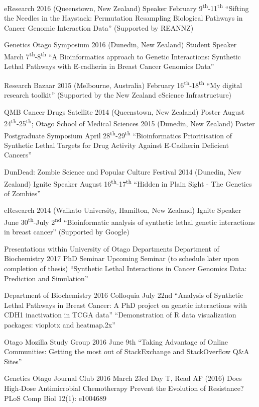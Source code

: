 eResearch 2016 (Queenstown, New Zealand) Speaker February 9\textsuperscript{th}-11\textsuperscript{th}
``Sifting the Needles in the Haystack: Permutation Resampling Biological Pathways in Cancer Genomic Interaction Data'' (Supported by REANNZ)

Genetics Otago Symposium 2016 (Dunedin, New Zealand) Student Speaker March 7\textsuperscript{th}-8\textsuperscript{th} 
``A Bioinformatics approach to Genetic Interactions: Synthetic Lethal Pathways with E-cadherin in Breast Cancer Genomics Data''

Research Bazaar 2015 (Melbourne, Australia) February 16\textsuperscript{th}-18\textsuperscript{th}
``My digital research toolkit'' (Supported by the New Zealand eScience Infrastructure)


QMB Cancer Drugs Satellite 2014 (Queenstown, New Zealand) Poster August 24\textsuperscript{th}-25\textsuperscript{th};
Otago School of Medical Sciences 2015 (Dunedin, New Zealand) Poster Postgraduate Symposium April 28\textsuperscript{th}-29\textsuperscript{th}
“Bioinformatics Prioritisation of Synthetic Lethal Targets for Drug Activity Against E-Cadherin Deficient Cancers”

DunDead: Zombie Science and Popular Culture Festival 2014 (Dunedin, New Zealand) Ignite Speaker August 16\textsuperscript{th}-17\textsuperscript{th}
``Hidden in Plain Sight - The Genetics of Zombies''


eResearch 2014 (Waikato University, Hamilton, New Zealand) Ignite Speaker June 30\textsuperscript{th}-July 2\textsuperscript{nd}
``Bioinformatic analysis of synthetic lethal genetic interactions in breast cancer'' (Supported by Google)


\iffalse
Presentations within University of Otago Departments
Department of Biochemistry 2017 PhD Seminar
Upcoming Seminar (to schedule later upon completion of thesis)
``Synthetic Lethal Interactions in Cancer Genomics Data: Prediction and Simulation''

Department of Biochemistry 2016 Colloquia July 22nd
``Analysis of Synthetic Lethal Pathways in Breast Cancer: A PhD project on genetic interactions with CDH1 inactivation in TCGA data''
``Demonstration of R data visualization packages: vioplotx and heatmap.2x''

Otago Mozilla Study Group 2016 June 9th
``Taking Advantage of Online Communities: Getting the most out of StackExchange and StackOverflow Q&A Sites''

Genetics Otago Journal Club 2016 March 23rd 
Day T, Read AF (2016) Does High-Dose Antimicrobial Chemotherapy Prevent the Evolution of Resistance? PLoS Comp Biol 12(1): e1004689

